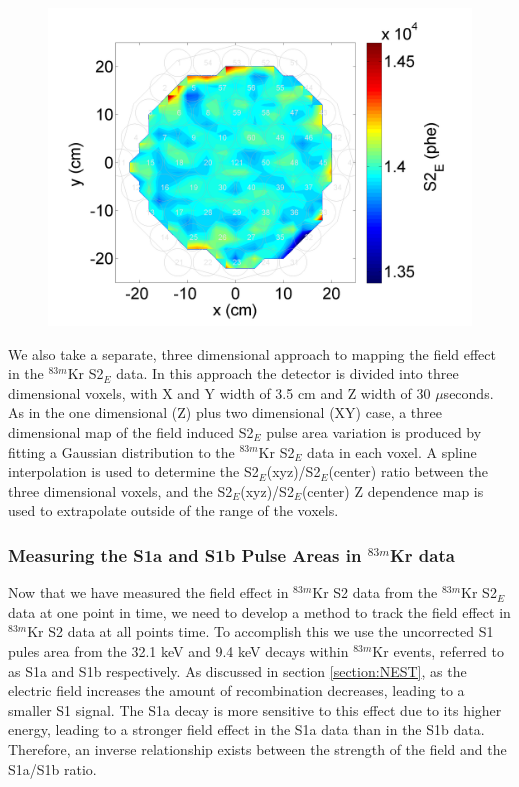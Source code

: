 \documentclass[a4paper,12pt]{article}
\begin{document}
{\begin{figure}
\includegraphics[scale=0.45]{Run04Corrections/Kr_S2_XYDep.png}
 \label{fig:KrXYDep}
\end{figure}

We also take a separate, three dimensional approach to mapping the field effect in the $^{83m}$Kr S2$_E$ data. In this approach the detector is divided into three dimensional voxels, with X and Y width of 3.5 cm and Z width of 30 $\mu$seconds.  As in the one dimensional (Z) plus two dimensional (XY) case, a three dimensional map of the field induced S2$_E$ pulse area variation is produced by fitting a Gaussian distribution to the $^{83m}$Kr S2$_E$ data in each voxel.  A spline interpolation is used to determine the S2$_E$(xyz)/S2$_E$(center) ratio between the three dimensional voxels, and the S2$_E$(xyz)/S2$_E$(center) Z dependence map is used to extrapolate outside of the range of the voxels. 

\subsubsection{Measuring the S1a and S1b Pulse Areas in $^{83m}$Kr data} \label{section:S1aS1b1}

Now that we have measured the field effect in $^{83m}$Kr S2 data from the $^{83m}$Kr S2$_E$ data at one point in time, we need to develop a method to track the field effect in $^{83m}$Kr S2 data at all points time.  To accomplish this we use the uncorrected S1 pules area from the 32.1 keV and 9.4 keV decays within $^{83m}$Kr events, referred to as S1a and S1b respectively.  As discussed in section \ref{section:NEST}, as the electric field increases the amount of recombination decreases, leading to a smaller S1 signal.  The S1a decay is more sensitive to this effect due to its higher energy, leading to a stronger field effect in the S1a data than in the S1b data.   Therefore, an inverse relationship exists between the strength of the field and the S1a/S1b ratio.  

}
\end{document}
